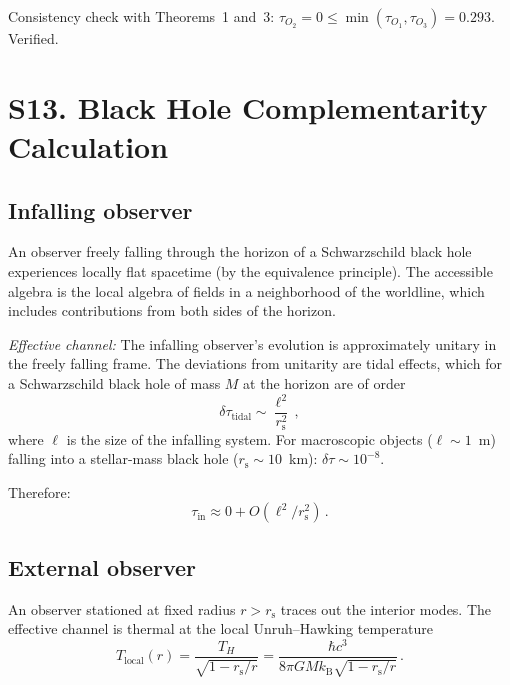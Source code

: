 \documentclass[aps,prd,preprint,superscriptaddress,longbibliography]{revtex4-2}
\newcommand{\kB}{k_{\mathrm{B}}}
\newcommand{\tauasym}{\tau}
\newcommand{\rs}{r_{\mathrm{s}}}
\begin{document}
Consistency check with Theorems~1 and~3:
$\tauasym_{O_2} = 0 \leq \min(\tauasym_{O_1},\tauasym_{O_3})
= 0.293$.  Verified.

\section{S13. Black Hole Complementarity Calculation}
\label{sec:BH}

\subsection{Infalling observer}

An observer freely falling through the horizon of a Schwarzschild
black hole experiences locally flat spacetime (by the equivalence
principle).  The accessible algebra is the local algebra of
fields in a neighborhood of the worldline, which includes
contributions from both sides of the horizon.

\emph{Effective channel:} The infalling observer's evolution is
approximately unitary in the freely falling frame.  The
deviations from unitarity are tidal effects, which for a
Schwarzschild black hole of mass $M$ at the horizon are of order
\begin{equation}
  \delta\tauasym_{\mathrm{tidal}} \sim \frac{\ell^2}{\rs^2}\,,
  \label{eq:tidal}
\end{equation}
where $\ell$ is the size of the infalling system.  For macroscopic
objects ($\ell \sim 1$~m) falling into a stellar-mass black hole
($\rs \sim 10$~km): $\delta\tauasym \sim 10^{-8}$.

Therefore:
\begin{equation}
  \tauasym_{\mathrm{in}} \approx 0 + O(\ell^2/\rs^2)\,.
  \label{eq:tau_in}
\end{equation}

\subsection{External observer}

An observer stationed at fixed radius $r > \rs$ traces out the
interior modes.  The effective channel is thermal at the local
Unruh--Hawking temperature
\begin{equation}
  T_{\mathrm{local}}(r) = \frac{T_H}{\sqrt{1-\rs/r}}
  = \frac{\hbar c^3}{8\pi G M \kB\sqrt{1-\rs/r}}\,.
  \label{eq:T_local}
\end{equation}
\end{document}
